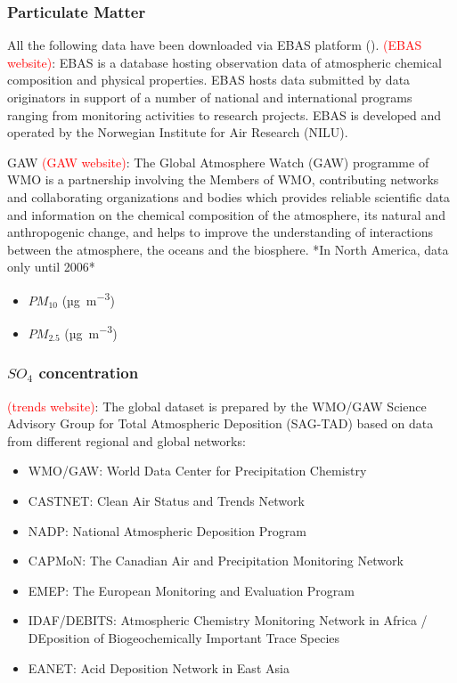 \documentclass[journal abbreviation, manuscript]{copernicus}
\begin{document}
\subsubsection{Particulate Matter}
All the following data have been downloaded via EBAS platform (\cite{ebasweb}).
\textcolor{red}{(EBAS website)}: EBAS is a database hosting observation data of atmospheric chemical composition and physical properties. EBAS hosts data submitted by data originators in support of a number of national and international programs ranging from monitoring activities to research projects. EBAS is developed and operated by the Norwegian Institute for Air Research (NILU).

GAW \textcolor{red}{(GAW website)}: The Global Atmosphere Watch (GAW) programme of WMO is a partnership involving the Members of WMO, contributing networks and collaborating organizations and bodies which provides reliable scientific data and information on the chemical composition of the atmosphere, its natural and anthropogenic change, and helps to improve the understanding of interactions between the atmosphere, the oceans and the biosphere.
*In North America, data only until 2006*
\begin{itemize}
 \item $PM_{10}$ (\unit{µg.m^{-3}})
 \item $PM_{2.5}$ (\unit{µg.m^{-3}})
\end{itemize}

\subsubsection{$SO_{4}$ concentration}
\textcolor{red}{(trends website)}: The global dataset is prepared by the WMO/GAW Science Advisory Group for Total Atmospheric Deposition (SAG-TAD) based on data from different regional and global networks:
\begin{itemize}
 \item WMO/GAW: World Data Center for Precipitation Chemistry
 \item CASTNET: Clean Air Status and Trends Network
 \item NADP: National Atmospheric Deposition Program
 \item CAPMoN: The Canadian Air and Precipitation Monitoring Network
 \item EMEP: The European Monitoring and Evaluation Program
 \item IDAF/DEBITS: Atmospheric Chemistry Monitoring Network in Africa / DEposition of Biogeochemically Important Trace Species
 \item EANET: Acid Deposition Network in East Asia
\end{itemize}
\end{document}
